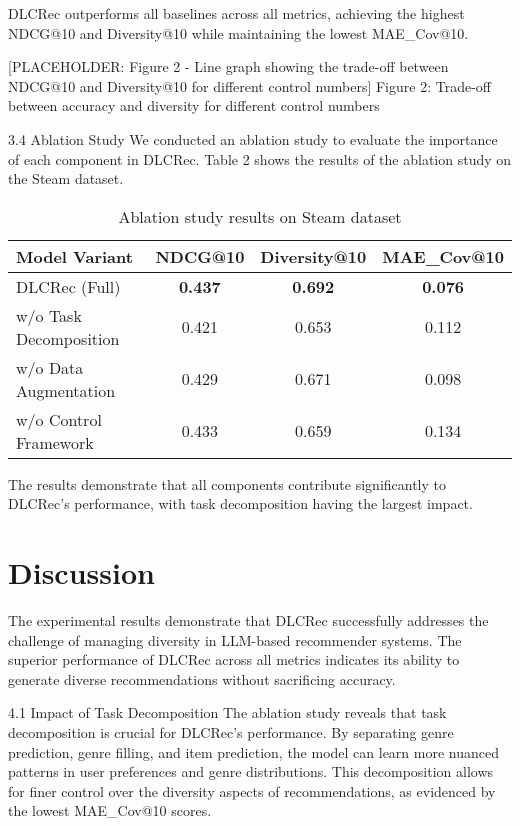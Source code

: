 \documentclass[12pt,letterpaper]{article}
\begin{document}
DLCRec outperforms all baselines across all metrics, achieving the highest NDCG@10 and Diversity@10 while maintaining the lowest MAE_Cov@10.

[PLACEHOLDER: Figure 2 - Line graph showing the trade-off between NDCG@10 and Diversity@10 for different control numbers]
Figure 2: Trade-off between accuracy and diversity for different control numbers

3.4 Ablation Study
We conducted an ablation study to evaluate the importance of each component in DLCRec. Table 2 shows the results of the ablation study on the Steam dataset.

\begin{table}[h]
\centering
\begin{tabular}{lccc}
\hline
Model Variant & NDCG@10 & Diversity@10 & MAE_Cov@10 \\
\hline
DLCRec (Full) & \textbf{0.437} & \textbf{0.692} & \textbf{0.076} \\
w/o Task Decomposition & 0.421 & 0.653 & 0.112 \\
w/o Data Augmentation & 0.429 & 0.671 & 0.098 \\
w/o Control Framework & 0.433 & 0.659 & 0.134 \\
\hline
\end{tabular}
\caption{Ablation study results on Steam dataset}
\end{table}

The results demonstrate that all components contribute significantly to DLCRec's performance, with task decomposition having the largest impact.

\section{Discussion}

The experimental results demonstrate that DLCRec successfully addresses the challenge of managing diversity in LLM-based recommender systems. The superior performance of DLCRec across all metrics indicates its ability to generate diverse recommendations without sacrificing accuracy.

4.1 Impact of Task Decomposition
The ablation study reveals that task decomposition is crucial for DLCRec's performance. By separating genre prediction, genre filling, and item prediction, the model can learn more nuanced patterns in user preferences and genre distributions. This decomposition allows for finer control over the diversity aspects of recommendations, as evidenced by the lowest MAE_Cov@10 scores.
\end{document}
